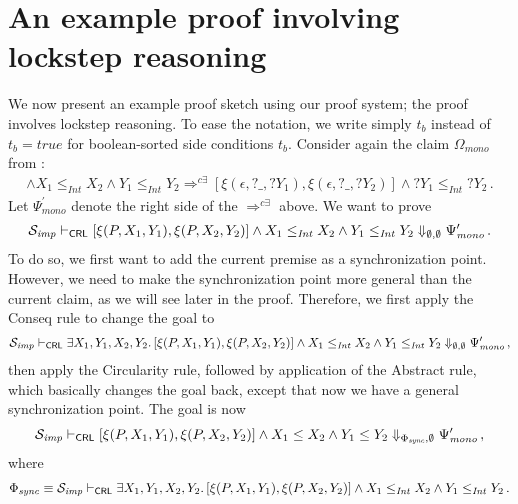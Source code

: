 \section{An example proof involving lockstep reasoning}\label{sec:example}

We now present an example proof sketch using our proof system; the proof involves lockstep reasoning.
To ease the notation, we write simply $t_b$ instead of $t_b = \mathit{true}$ for
boolean-sorted side conditions $t_b$.
Consider again the claim $\Omega_{\mathit{mono}}$ from :
\begin{align*}
  [\xi(P, X_1, Y_1),\xi(P, X_2, Y_2)] \land X_1 \leq_{\mathit{Int}} X_2 \land Y_1 \leq_{\mathit{Int}} Y_2
   \Rightarrow^{c\exists} [\xi(\epsilon, ?\_, ?Y_1), \xi(\epsilon, ?\_, ?Y_2)] \land ?Y_1 \leq_{\mathit{Int}} ?Y_2 \, .
\end{align*}
Let $\Psi^\prime_{\mathit{mono}}$ denote the right side of the $\Rightarrow^{c\exists}$ above.
We want to prove
\begin{align*}
  \mathcal{S}_{\mathit{imp}} \vdash_{\mathsf{CRL}} [\xi(P, X_1, Y_1),\xi(P, X_2, Y_2)] \land X_1 \leq_{\mathit{Int}} X_2 \land Y_1 \leq_{\mathit{Int}} Y_2
  \Downarrow_{\emptyset, \emptyset} \Psi^\prime_{\mathit{mono}} \, .
\end{align*}
To do so, we first want to add the current premise as a synchronization point.
However, we need to make the synchronization point more general than the current claim, as we will see later in the proof.
Therefore, we first apply the Conseq rule to change the goal to
\begin{align*}
  \mathcal{S}_{\mathit{imp}} \vdash_{\mathsf{CRL}} \exists X_1,Y_1,X_2,Y_2.\, [\xi(P, X_1, Y_1),\xi(P, X_2, Y_2)] \land X_1 \leq_{\mathit{Int}} X_2 \land Y_1 \leq_{\mathit{Int}} Y_2
  \Downarrow_{\emptyset, \emptyset} \Psi^\prime_{\mathit{mono}} \, ,
\end{align*}
then apply the Circularity rule, followed by application of the Abstract rule, which basically changes the goal
back, except that now we have a general synchronization point. The goal is now
\begin{align*}
  \mathcal{S}_{\mathit{imp}} \vdash_{\mathsf{CRL}} [\xi(P, X_1, Y_1),\xi(P, X_2, Y_2)] \land X_1 \leq X_2 \land Y_1 \leq Y_2
  \Downarrow_{\Phi_{\mathit{sync}}, \emptyset} \Psi^\prime_{\mathit{mono}} \, ,
\end{align*}
where
\begin{align*}
  \Phi_{\mathit{sync}} \equiv \mathcal{S}_{\mathit{imp}} \vdash_{\mathsf{CRL}} \exists X_1,Y_1,X_2,Y_2.\, [\xi(P, X_1, Y_1),\xi(P, X_2, Y_2)] \land X_1 \leq_{\mathit{Int}} X_2 \land Y_1 \leq_{\mathit{Int}} Y_2 \, .
\end{align*}
